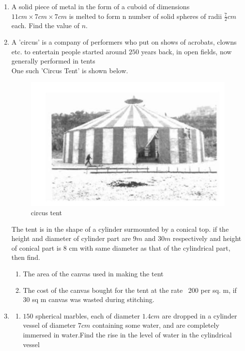\documentclass{article}
\begin{document}
\begin{enumerate}
 \item  A solid piece of metal in the form of a cuboid of dimensions $11 cm\times 7 cm\times 7 cm$ is melted to form n number of solid spheres of radii $\frac{7}{2}cm$ each. Find the value of $n$.
\newpage     
\item  A 'circus' is a company of performers who put on shows of acrobats, clowns etc. to entertain people started around $250$ years back, in open fields, now generally performed in tents
\\
One such 'Circus Tent' is shown below.
 \begin{figure}[H]
 \centering
 \includegraphics[width=\columnwidth]{figs/circus tent.png}
 \caption{circus tent}
 \label{tab:circus tent.png}
 \end{figure}
  The tent is in the shape of a cylinder surmounted by a conical top. if the height and diameter of cylinder part are $9 m$ and $30 m$ respectively and height of conical part is 8 cm with same diameter as that of the cylindrical part, then find.
    \begin{enumerate}
    \item  The area of the canvas used in making the tent
    \item  The cost of the canvas bought for the tent at the rate \rupee~200 per sq. m, if 30 sq m canvas was wasted during stitching.
    \end{enumerate}
\newpage
\item 
\begin{enumerate}
   \item $150$ spherical marbles, each of diameter $1.4 cm$ are dropped in a cylinder vessel of diameter $7cm$ containing some water, and are completely immersed in water.Find the rise in the level of water in the cylindrical vessel

\end{enumerate}
\end{enumerate}
\end{document}
